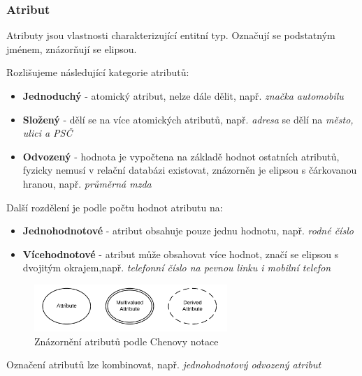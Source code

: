 \documentclass[czech,bachelor,public,dept460,male,oneside]{diploma}
\begin{document}
	\subsubsection{Atribut}
	Atributy jsou vlastnosti charakterizující entitní typ. Označují se podstatným jménem, znázorňují se elipsou.
	
	Rozlišujeme následující kategorie atributů:
	
	\begin{itemize}
		\item \textbf{Jednoduchý} - atomický atribut, nelze dále dělit, např. \textit{značka automobilu}
		\item \textbf{Složený} - dělí se na více atomických atributů, např. \textit{adresa} se dělí na \textit{město, ulici a PSČ} 
		\item \textbf{Odvozený} - hodnota je vypočtena na základě hodnot ostatních atributů, fyzicky nemusí v relační databázi existovat, znázorněn je elipsou s čárkovanou hranou, např. \textit{průměrná mzda}
	\end{itemize}

	Další rozdělení je podle počtu hodnot atributu na:
	
	\begin{itemize}
		\item \textbf{Jednohodnotové} - atribut obsahuje pouze jednu hodnotu, např. \textit{rodné číslo}
		\item \textbf{Vícehodnotové} - atribut může obsahovat více hodnot, značí se elipsou s dvojitým okrajem,např. \textit{telefonní číslo na pevnou linku i mobilní telefon}
	\end{itemize}
	
	\begin{figure}[!h]
		\centering
		\includegraphics[width=0.65\textwidth]{Figures/ChenAttr}
		\caption{Znázornění atributů podle Chenovy notace}
	\end{figure}
	
	Označení atributů lze kombinovat, např. \textit{jednohodnotový odvozený atribut}
	
\end{document}
